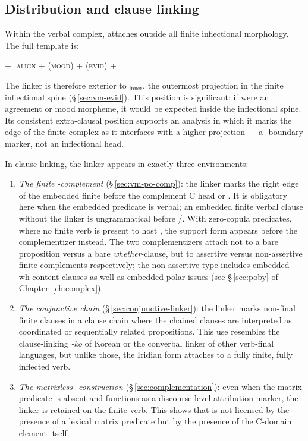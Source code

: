 \subsection{Distribution and clause linking}

Within the verbal complex,  attaches outside all finite inflectional
morphology. The full template is:

\begin{center}
\Stem{} + .\textsc{align} + (\textsc{mood}) +
(\textsc{evid}) + 
\end{center}

\noindent The linker is therefore exterior to $_\text{inner}$,
the outermost projection in the finite inflectional spine
(§\,\ref{sec:vm-evid}). This position is significant: if  were an
agreement or mood morpheme, it would be expected inside the inflectional spine.
Its consistent extra-clausal position supports an analysis in which it marks the
edge of the finite complex as it interfaces with a higher projection --- a
-boundary marker, not an inflectional head.

In clause linking, the linker appears in exactly three environments:

\begin{enumerate}
  \item \textit{The finite -complement} (§\,\ref{sec:vm-po-comp}): the
    linker marks the right edge of the embedded finite  before the
    complement C head  or . It is obligatory here when the
    embedded predicate is verbal; an embedded finite verbal clause without the
    linker is ungrammatical before /. With zero-copula
    predicates, where no finite verb is present to host , the support
    form  appears before the complementizer instead. The two
    complementizers attach not to a bare proposition versus a bare
    \textit{whether}-clause, but to assertive versus non-assertive finite
    complements respectively; the non-assertive type includes embedded
    wh-content clauses as well as embedded polar issues (see §\,\ref{sec:poby}
    of Chapter~\ref{ch:complex}).

  \item \textit{The conjunctive chain} (§\,\ref{sec:conjunctive-linker}): the
    linker marks non-final finite clauses in a clause chain where the chained
    clauses are interpreted as coordinated or sequentially related propositions.
    This use resembles the clause-linking \textit{-ko} of Korean or the
    converbal linker of other verb-final languages, but unlike those, the
    Iridian form attaches to a fully finite, fully inflected verb.

  \item \textit{The matrixless -construction}
    (§\,\ref{sec:complementation}): even when the matrix predicate is absent and
     functions as a discourse-level attribution marker, the linker
     is retained on the finite verb. This shows that  is not
    licensed by the presence of a lexical matrix predicate but by the presence
    of the C-domain element  itself.
\end{enumerate}

